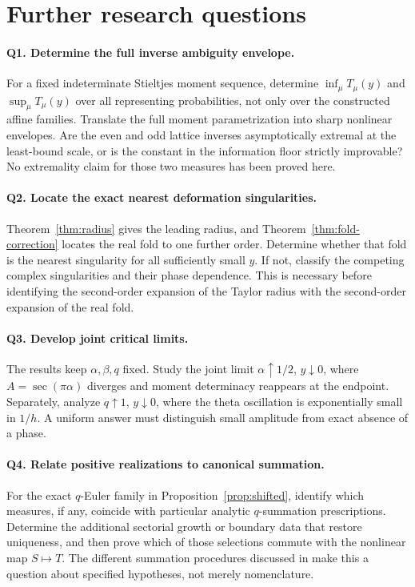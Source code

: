 \documentclass[11pt,a4paper]{article}
\numberwithin{equation}{section}
\theoremstyle{definition}
\theoremstyle{remark}
\begin{document}
\section{Further research questions}
\label{sec:questions}

\paragraph{Q1. Determine the full inverse ambiguity envelope.}
For a fixed indeterminate Stieltjes moment sequence, determine
\(\inf_\mu T_\mu(y)\) and \(\sup_\mu T_\mu(y)\) over all representing
probabilities, not only over the constructed affine families. Translate
the full moment parametrization into sharp nonlinear envelopes. Are the
even and odd lattice inverses asymptotically extremal at the least-bound
scale, or is the constant in the information floor strictly improvable?
No extremality claim for those two measures has been proved here.

\paragraph{Q2. Locate the exact nearest deformation singularities.}
Theorem~\ref{thm:radius} gives the leading radius, and
Theorem~\ref{thm:fold-correction} locates the real fold to one further
order. Determine whether that fold is the nearest singularity for all
sufficiently small \(y\). If not, classify the competing complex
singularities and their phase dependence. This is necessary before
identifying the second-order expansion of the Taylor radius with the
second-order expansion of the real fold.

\paragraph{Q3. Develop joint critical limits.}
The results keep \(\alpha,\beta,q\) fixed. Study the joint limit
\(\alpha\uparrow1/2\), \(y\downarrow0\), where
\(A=\sec(\pi\alpha)\) diverges and moment determinacy reappears at the
endpoint. Separately, analyze \(q\uparrow1\), \(y\downarrow0\), where
the theta oscillation is exponentially small in \(1/h\). A uniform
answer must distinguish small amplitude from exact absence of a phase.

\paragraph{Q4. Relate positive realizations to canonical summation.}
For the exact \(q\)-Euler family in
Proposition~\ref{prop:shifted}, identify which measures, if any, coincide
with particular analytic \(q\)-summation prescriptions. Determine the
additional sectorial growth or boundary data that restore uniqueness,
and then prove which of those selections commute with the nonlinear
map \(S\mapsto T\). The different summation procedures discussed in
\cite{divizio-zhang} make this a question about specified hypotheses,
not merely nomenclature.
\end{document}
